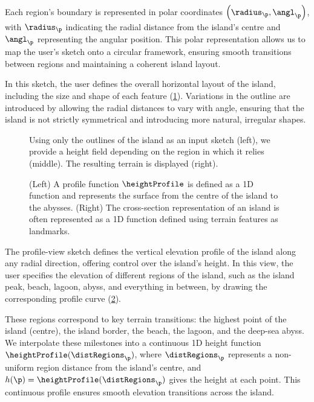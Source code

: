 Each region's boundary is represented in polar coordinates $\left(\radius_\p, \angl_\p\right)$, with $\radius_\p$ indicating the radial distance from the island's centre and $\angl_\p$ representing the angular position. This polar representation allows us to map the user's sketch onto a circular framework, ensuring smooth transitions between regions and maintaining a coherent island layout.

In this sketch, the user defines the overall horizontal layout of the island, including the size and shape of each feature (\cref{fig:coral-island-procedural-height-only}). Variations in the outline are introduced by allowing the radial distances to vary with angle, ensuring that the island is not strictly symmetrical and introducing more natural, irregular shapes.

\begin{figure}[H]
    \caption[Curve-based island generation using only outlines]{Using only the outlines of the island as an input sketch (left), we provide a height field depending on the region in which it relies (middle). The resulting terrain is displayed (right). }
    \label{fig:coral-island-procedural-height-only}
\end{figure}

\begin{figure}
    \caption[Our profile function inspired by the typical cross-section representation of islands' reefs]{(Left) A profile function $\heightProfile$ is defined as a 1D function and represents the surface from the centre of the island to the abysses. (Right) The cross-section representation of an island is often represented as a 1D function defined using terrain features as landmarks.}
    \label{fig:coral-island-profile-function}
\end{figure}

The profile-view sketch defines the vertical elevation profile of the island along any radial direction, offering control over the island's height. In this view, the user specifies the elevation of different regions of the island, such as the island peak, beach, lagoon, abyss, and everything in between, by drawing the corresponding profile curve (\cref{fig:coral-island-profile-function}).

These regions correspond to key terrain transitions: the highest point of the island (centre), the island border, the beach, the lagoon, and the deep-sea abyss. We interpolate these milestones into a continuous 1D height function $\heightProfile(\distRegions_\p)$, where $\distRegions_\p$ represents a non-uniform region distance from the island's centre, and $h(\p) = \heightProfile(\distRegions_\p)$ gives the height at each point. This continuous profile ensures smooth elevation transitions across the island.

